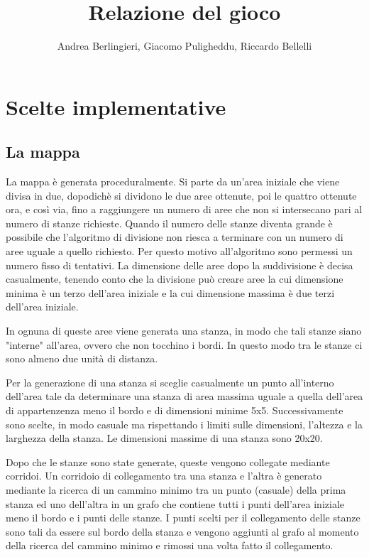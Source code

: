 \documentclass[12pt]{report}
\title{Relazione del gioco}
\author{Andrea Berlingieri, 
	Giacomo Puligheddu, 
	Riccardo Bellelli}
\date{}
\begin{document}
\maketitle
\tableofcontents

\chapter{Scelte implementative}

\section{La mappa}

La mappa è generata proceduralmente. Si parte da un'area iniziale che viene divisa in due, dopodichè si
dividono le due aree ottenute, poi le quattro ottenute ora, e così via, fino a raggiungere un numero di aree
che non si intersecano pari al numero di stanze richieste. Quando il numero delle stanze diventa grande è
possibile che l'algoritmo di divisione non riesca a terminare con un numero di aree uguale a quello richiesto.
Per questo motivo all'algoritmo sono permessi un numero fisso di tentativi. La dimensione delle aree dopo la
suddivisione è decisa casualmente, tenendo conto che la divisione può creare aree la cui dimensione minima
è un terzo dell'area iniziale e la cui dimensione massima è due terzi dell'area iniziale.

In ognuna di queste aree viene generata una stanza, in modo che tali stanze siano "interne" all'area, ovvero che non
tocchino i bordi. In questo modo tra le stanze ci sono almeno due unità di distanza.

Per la generazione di una stanza si sceglie casualmente un punto all'interno dell'area tale da determinare una
stanza di area massima uguale a quella dell'area di appartenzenza meno il bordo e di dimensioni minime 5x5.
Successivamente sono scelte, in modo casuale ma rispettando i limiti sulle dimensioni, l'altezza e la
larghezza della stanza. Le dimensioni massime di una stanza sono 20x20.

Dopo che le stanze sono state generate, queste vengono collegate mediante corridoi. Un corridoio di
collegamento tra una stanza e l'altra è generato mediante la ricerca di un cammino minimo tra un punto
(casuale) della prima stanza ed uno dell'altra in un grafo che contiene tutti i punti dell'area iniziale meno
il bordo e i punti delle stanze. I punti scelti per il collegamento delle stanze sono tali da essere sul bordo
della stanza e vengono aggiunti al grafo al momento della ricerca del cammino minimo e rimossi una volta fatto
il collegamento.
\end{document}
